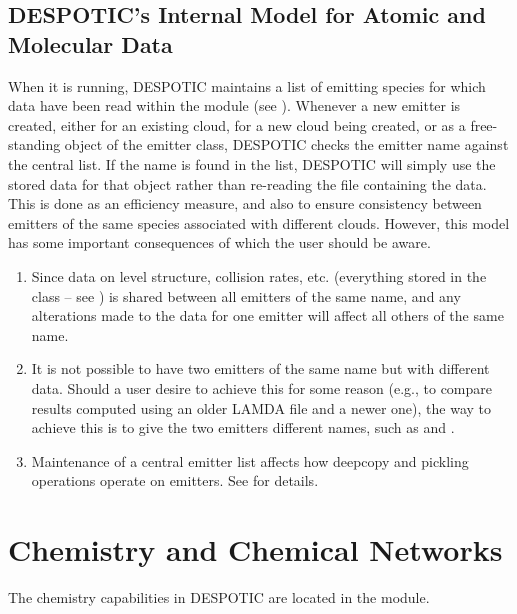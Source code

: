 \documentclass[letterpaper,10pt,english]{sphinxmanual}
\begin{document}
\section{DESPOTIC's Internal Model for Atomic and Molecular Data}
\label{data:ssec-database-internal}\label{data:despotic-s-internal-model-for-atomic-and-molecular-data}
When it is running, DESPOTIC maintains a list of emitting species for
which data have been read within the  module (see
{\hyperref[fulldoc:sssec-full-emitter]{\emph{}}}). Whenever a new emitter is created, either for an
existing cloud, for a new cloud being created, or as a free-standing
object of the emitter class, DESPOTIC checks the emitter name against
the central list. If the name is found in the list, DESPOTIC will
simply use the stored data for that object rather than re-reading the
file containing the data. This is done as an efficiency measure, and
also to ensure consistency between emitters of the same species
associated with different clouds. However, this model has some
important consequences of which the user should be aware.
\begin{enumerate}
\item {} 
Since data on level structure, collision rates, etc. (everything
stored in the  class -- see {\hyperref[fulldoc:sssec-full-emitterdata]{\emph{}}}) is
shared between all emitters of the same name, and any alterations
made to the data for one emitter will affect all others of the same
name.

\item {} 
It is not possible to have two emitters of the same name but with
different data. Should a user desire to achieve this for some
reason (e.g., to compare results computed using an older LAMDA file
and a newer one), the way to achieve this is to give the two
emitters different names, such as  and .

\item {} 
Maintenance of a central emitter list affects how deepcopy and
pickling operations operate on emitters. See
{\hyperref[fulldoc:sssec-full-emitterdata]{\emph{}}} for details.

\end{enumerate}


\chapter{Chemistry and Chemical Networks}
\label{chemistry::doc}\label{chemistry:chemistry-and-chemical-networks}\label{chemistry:sec-chemistry}
The chemistry capabilities in DESPOTIC are located in the
 module.
\end{document}
